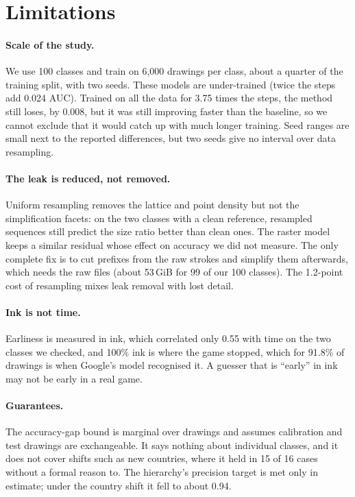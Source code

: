 \section{Limitations}
\label{sec:limits}

\paragraph{Scale of the study.} We use 100 classes and train on 6{,}000 drawings per class, about a
quarter of the training split, with two seeds. These models are under-trained (twice the steps
add 0.024 AUC). Trained on all the data for 3.75 times the steps, the method still loses, by 0.008,
but it was still improving faster than the baseline, so we cannot exclude that it would catch up
with much longer training. Seed ranges are small next to the reported differences, but two seeds
give no interval over data resampling.

\paragraph{The leak is reduced, not removed.} Uniform resampling removes the lattice and point
density but not the simplification facets: on the two classes with a clean reference, resampled
sequences still predict the size ratio better than clean ones. The raster model keeps a similar
residual whose effect on accuracy we did not measure. The only complete fix is to cut prefixes
from the raw strokes and simplify them afterwards, which needs the raw files (about 53\,GiB for 99 of our 100
classes). The 1.2-point cost of resampling mixes leak removal with lost detail.

\paragraph{Ink is not time.} Earliness is measured in ink, which correlated only 0.55 with time on
the two classes we checked, and 100\% ink is where the game stopped, which for 91.8\% of drawings is
when Google's model recognised it. A guesser that is ``early'' in ink may not be early in a real
game.

\paragraph{Guarantees.} The accuracy-gap bound is marginal over drawings and assumes calibration
and test drawings are exchangeable. It says nothing about individual classes, and it does not cover
shifts such as new countries, where it held in 15 of 16 cases without a formal reason to. The
hierarchy's precision target is met only in estimate; under the country shift it fell to about
0.94.

